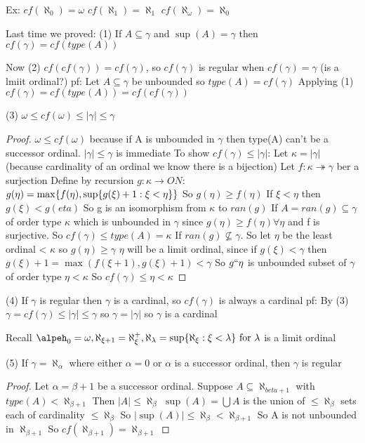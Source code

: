 Ex: $cf(\aleph_0) = \omega$
$cf(\aleph_1) = \aleph_1$
$cf(\aleph_\omega)=\aleph_0$

Last time we proved:
(1) If $A \subseteq \gamma$ and $\sup(A) = \gamma$ then $cf(\gamma) = cf(type(A))$

Now
(2) $cf(cf(\gamma)) = cf(\gamma)$, so $cf(\gamma)$ is regular when $cf(\gamma) = \gamma$ (is a lmiit ordinal?)
pf:
    Let $A \subseteq \gamma$ be unbounded so $type(A) = cf(\gamma)$
    Applying (1) $cf(\gamma) = cf(type(A)) = cf(cf(\gamma))$


(3) $\omega \leq cf(\omega) \leq |\gamma| \leq \gamma$
\begin{proof}
    $\omega \leq cf(\omega)$ because if A is unbounded in $\gamma$ then type(A) can't be a successor ordinal.
    $|\gamma| \leq \gamma$ is immediate
    To show $cf(\gamma) \leq |\gamma|$:
    Let $\kappa = |\gamma|$ (because cardinality of an ordinal we know there is a bijection)
    Let $f: \kappa \twoheadrightarrow \gamma$ ber a surjection
    Define by recursion $g : \kappa \rightarrow ON$:
    $g(\eta) = \max\{f(\eta), \sup\{g(\xi) + 1 : \xi < \eta\}\}$
    So $g(\eta) \geq f(\eta)$
    If $\xi < \eta$ then $g(\xi) < g(eta)$
    So g is an isomorphism from $\kappa$ to $ran(g)$
    If $A = ran(g) \subseteq \gamma$ of order type $\kappa$ which is unbounded in $\gamma$ since $g(\eta) \geq f(\eta) \forall \eta$ and f is surjective.
    So $cf(\gamma) \leq type(A) = \kappa$
    If $ran(g) \nsubseteq \gamma$.
    So let $\eta$ be the least ordinal < $\kappa$ so $g(\eta) \geq \gamma$
    $\eta$ will be a limit ordinal, since if $g(\xi) < \gamma$ then $g(\xi) + 1 = \max(f(\xi+1), g(\xi)+1) < \gamma$
    So $g``\eta$ is unbounded subset of $\gamma$ of order type $\eta < \kappa$
    So $cf(\gamma) \leq \eta < \kappa$

\end{proof}

(4) If $\gamma$ is regular then $\gamma$ is a cardinal, so $cf(\gamma)$ is always a cardinal
pf:
    By (3) $\gamma = cf(\gamma) \leq |\gamma| \leq \gamma$ so $\gamma = |\gamma|$ so $\gamma$ is a cardinal

Recall $\alpeh_0 = \omega, \aleph_{\xi + 1} = \aleph_\xi^+, \aleph_\lambda = \sup\set{\aleph_\xi : \xi < \lambda} \text{ for } \lambda$  is a limit ordinal

(5) If $\gamma = \aleph_\alpha$ where either $\alpha = 0$ or $\alpha$ is a successor ordinal, then $\gamma$ is regular
\begin{proof}
    Let $\alpha = \beta + 1$ be a successor ordinal.
    Suppose $A \subseteq \aleph_{beta+1} $ with $type(A) < \aleph_{\beta + 1}$
    Then $|A| \leq \aleph_\beta$
    $\sup(A) = \bigcup A$ is the union of $\leq \aleph_\beta$ sets each of cardinality $\leq \aleph_\beta$
    So $|\sup(A)| \leq \aleph_\beta < \aleph_{\beta+1}$
    So A is not unbounded in $\aleph_{\beta + 1}$
    So $cf(\aleph_{\beta + 1}) = \aleph_{\beta + 1}$
\end{proof}

